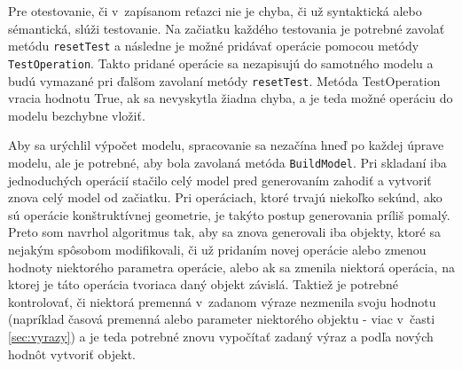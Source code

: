 Pre otestovanie, či v~zapísanom reťazci nie je chyba, či už syntaktická alebo sémantická, slúži testovanie. Na začiatku každého testovania je potrebné zavolať metódu \texttt{resetTest} a následne je možné pridávať operácie pomocou metódy \texttt{TestOperation}. 
Takto pridané operácie sa nezapisujú do samotného modelu a budú vymazané pri ďalšom zavolaní metódy \texttt{resetTest}. Metóda TestOperation vracia hodnotu True, ak sa nevyskytla žiadna chyba, a je teda možné operáciu do modelu bezchybne vložiť.


Aby sa urýchlil výpočet modelu, spracovanie sa nezačína hneď po každej úprave modelu, ale je potrebné, aby bola zavolaná metóda \texttt{BuildModel}.
Pri skladaní iba jednoduchých operácií stačilo celý model pred generovaním zahodiť a vytvoriť znova celý model od začiatku. Pri operáciach, ktoré trvajú niekoľko sekúnd, ako sú operácie konštruktívnej geometrie, je takýto postup generovania príliš pomalý.
Preto som navrhol algoritmus tak, aby sa znova generovali iba objekty, ktoré sa nejakým spôsobom modifikovali, či už pridaním novej operácie alebo zmenou hodnoty niektorého parametra operácie, alebo ak sa zmenila niektorá operácia, na ktorej je táto operácia tvoriaca daný objekt závislá. Taktiež je potrebné kontrolovať, či niektorá premenná v~zadanom výraze nezmenila svoju hodnotu (napríklad časová premenná alebo parameter niektorého objektu - viac v~časti \ref{sec:vyrazy}) a je teda potrebné znovu vypočítať zadaný výraz a podľa nových hodnôt vytvoriť objekt. 








